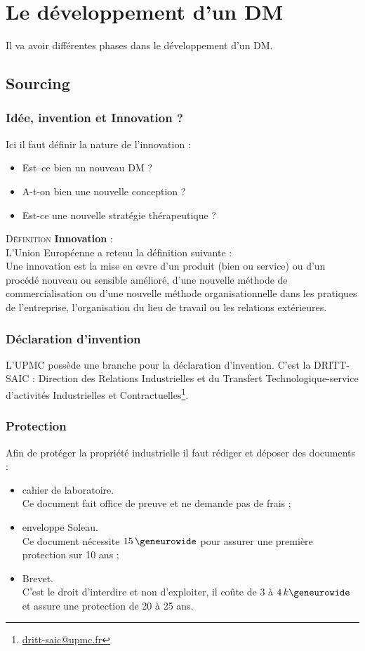 \documentclass[a4paper,11pt]{article}
\newcounter{defi}
\newcommand{\defi}[1]{\addtocounter{defi}{1}%
  \noindent\textsc{Définition \thedefi } \textbf{#1} :\\ }
\begin{document}
\begin{sloppypar}
\section{Le développement d'un DM}
Il va avoir différentes phases dans le développement d'un DM.

\subsection{\og Sourcing\fg}
\subsubsection{Idée, invention et Innovation ?}
Ici il faut définir la nature de l'innovation :
\begin{itemize}
 \item Est--ce bien un nouveau DM ?
 \item A-t-on bien une nouvelle conception ?
 \item Est-ce une nouvelle stratégie thérapeutique ?
\end{itemize}
\vspace{1.5ex}
\defi{Innovation}
L'Union Européenne a retenu la définition suivante :\\
\og Une innovation est la mise en \oe vre d'un produit (bien ou service) ou d'un procédé nouveau ou sensible amélioré, 
d'une nouvelle méthode de commercialisation ou d'une nouvelle méthode organisationnelle dans les pratiques de 
l'entreprise, l'organisation du lieu de travail ou les relations extérieures.\fg

\subsubsection{Déclaration d'invention}
L'UPMC possède une branche pour la déclaration d'invention. C'est la DRITT-SAIC : Direction des Relations Industrielles et du Transfert Technologique-service
d'activités Industrielles et Contractuelles\footnote{\href{Leur site}{dritt-saic@upmc.fr}}.
\subsubsection{Protection}
Afin de protéger la propriété industrielle il faut rédiger et déposer des documents :
\begin{itemize}
 \item cahier de laboratoire.\\
 Ce document fait office de preuve et ne demande pas de frais ;
 \item enveloppe Soleau.\\
 Ce document nécessite $15\,\geneurowide$ pour assurer une première protection sur 10 ans ;
 \item Brevet.\\
 C'est le droit d'interdire et non d'exploiter, il coûte de $3$ à $4\,k\geneurowide$ et assure une protection de 20 à 25 ans.\\
 

\end{itemize}
\end{sloppypar}
\end{document}
